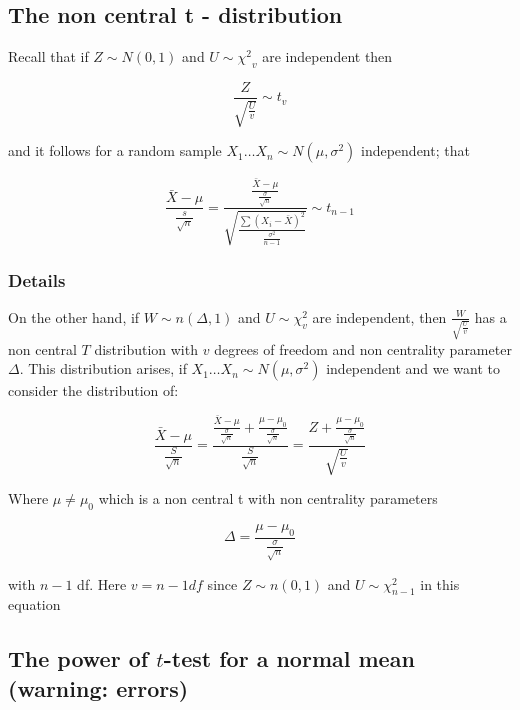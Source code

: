 \documentclass[12pt,a4paper]{article}
\theoremstyle{regla}
\theoremstyle{remark}
\theoremstyle{definition}
\theoremstyle{nonumberbreak}
\begin{document}
\subsection{The non central t - distribution}
\begin{fbox}
\begin{minipage}{0.97\textwidth}
Recall that if $Z \sim N(0, 1)$ and $ U \sim {\chi^2}_v$ are independent then

$$\frac{Z}{\sqrt{\frac{U}{v}}}\sim t_v$$

and it follows for a random sample $X_1 \ldots X_n \sim N(\mu, \sigma^2)$ independent; that


$$\frac{\bar {X} - \mu}{\frac{s} {\sqrt{n}}} = \frac{\frac{\bar {X} - \mu}{\frac{\sigma} {\sqrt{n}}}}{\sqrt{\frac{\sum ({X_i} -\bar {X})^2} { \frac {{\sigma}^2} {n-1}}}} \sim t_{n-1}$$

\end{minipage}
\end{fbox}
\subsubsection{Details}
On the other hand, if $W \sim n (\Delta,1) $ and $U \sim {\chi}^2_v $ are independent, then $\frac{W}{\sqrt{\frac{U}{v}}}$ has a non central $T$ distribution with $v$ degrees of freedom and non centrality parameter $\Delta$. This distribution arises, if $X_1 \ldots X_n \sim N(\mu, \sigma^2)$ independent and we want to consider the distribution of: 

$$\frac{\bar {X} - \mu}{\frac{S} {\sqrt{n}}} = \frac{\frac{\bar {X} - \mu}{\frac{\sigma} {\sqrt{n}}} + \frac{\mu - \mu_0 }{\frac{\sigma} {\sqrt{n}}}} {\frac{S}{\sqrt{n}}} = \frac {Z + \frac{\mu - \mu_0 }{\frac{\sigma} {\sqrt{n}}}}{\sqrt{\frac{U}{v}}}$$

Where $\mu \neq \mu_0$ which is a non central t with non centrality parameters

$$ \Delta = \frac{\mu - \mu_0 }{\frac{\sigma} {\sqrt{n}}}$$

with $n-1$ df. Here $ v = n-1 df$ since  $Z \sim n (0,1) $ and $U \sim {\chi}^2_{n-1} $ in this equation 




\subsection{The power of $t$-test for a normal mean (warning: errors)}
\end{document}
